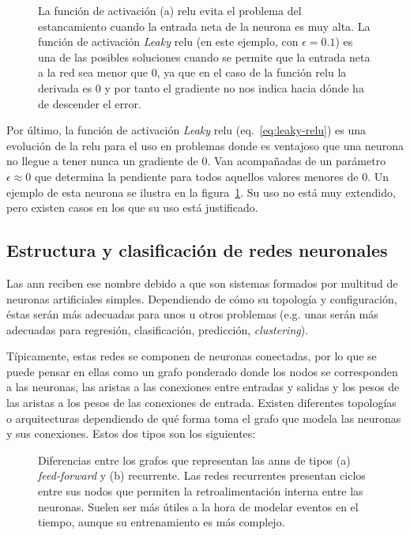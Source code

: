 \begin{figure}[t]
	\centering
	\qquad
	\caption[Funciones de activación: \acrshort{relu} y Leaky-\acrshort{relu}]{La función de activación (a) \gls{relu} evita el problema del estancamiento cuando la entrada neta de la neurona es muy alta. La función de activación \textit{Leaky} \gls{relu} (en este ejemplo, con $\epsilon = 0.1$) es una de las posibles soluciones cuando se permite que la entrada neta a la red sea menor que 0, ya que en el caso de la función \gls{relu} la derivada es 0 y por tanto el gradiente no nos indica hacia dónde ha de descender el error.}
	\label{fig:relu-and-leaky-relu}
\end{figure}

Por último, la función de activación \textit{Leaky} \gls{relu} (eq.~\ref{eq:leaky-relu}) es una evolución de la \gls{relu} para el uso en problemas donde es ventajoso que una neurona no llegue a tener nunca un gradiente de 0. Van acompañadas de un parámetro $\epsilon \approx 0$ que determina la pendiente para todos aquellos valores menores de $0$. Un ejemplo de esta neurona se ilustra en la figura~\ref{fig:relu-and-leaky-relu}. Su uso no está muy extendido, pero existen casos en los que su uso está justificado.

\subsection{Estructura y clasificación de redes neuronales}

Las \gls{ann} reciben ese nombre debido a que son sistemas formados por multitud de neuronas artificiales simples. Dependiendo de cómo su topología y configuración, éstas serán más adecuadas para unos u otros problemas (e.g. unas serán más adecuadas para regresión, clasificación, predicción, \textit{clustering}).

Típicamente, estas redes se componen de neuronas conectadas, por lo que se puede pensar en ellas como un grafo ponderado donde los nodos se corresponden a las neuronas, las aristas a las conexiones entre entradas y salidas y los pesos de las aristas a los pesos de las conexiones de entrada. Existen diferentes topologías o arquitecturas dependiendo de qué forma toma el grafo que modela las neuronas y sus conexiones. Estos dos tipos son los siguientes:

\begin{figure}[t]
	\centering
	\qquad
	\caption[Diferencias entre redes de tipo \textit{feed-forward} y \textit{recurrente}]{Diferencias entre los grafos que representan las \acp{ann} de tipos (a) \textit{feed-forward} y (b) recurrente. Las redes recurrentes presentan ciclos entre sus nodos que permiten la retroalimentación interna entre las neuronas. Suelen ser más útiles a la hora de modelar eventos en el tiempo, aunque su entrenamiento es más complejo.}
	\label{fig:ff-vs-rnn}
\end{figure}

